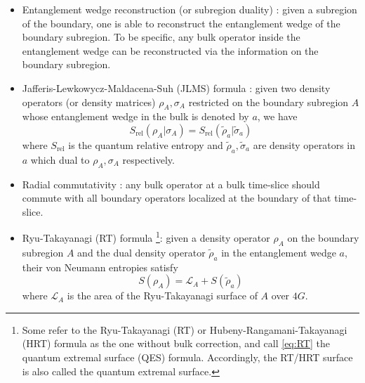 \documentclass[a4paper,11pt]{article}
\renewcommand{\=}[1]{\stackrel{#1}{=}} %
\def\Srel{S_{\text{rel}}}
\begin{document}
\begin{itemize}
	\item Entanglement wedge reconstruction (or subregion duality) \cite{Czech:2012bh,Hamilton:2006az,Morrison:2014jha,Bousso:2012sj,Bousso:2012mh,Hubeny:2012wa,Wall:2012uf,Headrick:2014cta,Jafferis:2015del,Dong:2016eik}: given a subregion of the boundary, one is able to reconstruct the entanglement wedge of the boundary subregion. To be specific, any bulk operator inside the entanglement wedge can be reconstructed via the information on the boundary subregion.
	
	\item  Jafferis-Lewkowycz-Maldacena-Suh (JLMS) formula \cite{Jafferis:2015del}: given two density operators (or density matrices) $\rho_{A},\sigma_A$ restricted on the boundary subregion $A$ whose entanglement wedge in the bulk is denoted by $a$, we have 
	\begin{equation}
		\Srel(\rho_A|\sigma_A)=\Srel(\tilde{\rho}_a|\tilde{\sigma}_a)
	\end{equation}
	where $\Srel$ is the quantum relative entropy and $\tilde{\rho}_a,\tilde{\sigma}_a$ are density operators in $a$ which dual to $\rho_{A},\sigma_A$ respectively.
	
	
	\item Radial commutativity \cite{Polchinski:1999yd,
		Almheiri_2015,Harlow:2018fse}: any bulk operator at a bulk time-slice should commute with all boundary operators localized at the boundary of that time-slice.
	
	\item Ryu-Takayanagi (RT) formula \cite{Ryu:2006bv,Hubeny:2007xt,Casini_2011,
		Lewkowycz:2013nqa,Nishioka:2018khk,Faulkner:2013ana,Engelhardt:2014gca}\footnote{Some refer to the Ryu-Takayanagi (RT) or Hubeny-Rangamani-Takayanagi (HRT) formula as the one without bulk correction, and call \eqref{eq:RT} the quantum extremal surface (QES) formula. Accordingly, the RT/HRT surface is also called the quantum extremal surface.}: given a density operator $\rho_{A}$ on the boundary subregion $A$ and the dual density operator $\tilde{\rho}_a$ in the entanglement wedge $a$, their von Neumann entropies satisfy
	\begin{equation}\label{eq:RT}
		S(\rho_A)=\mathcal{L}_A+S(\tilde{\rho}_a)
	\end{equation}
	where $\mathcal{L}_A$ is the area of the Ryu-Takayanagi surface of $A$ over $4G$.
\end{itemize}
\end{document}
